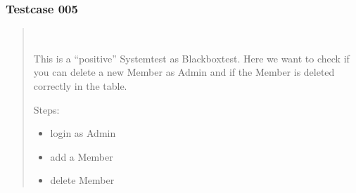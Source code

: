 \documentclass[letterpaper,10pt,english]{sphinxmanual}
\begin{document}
\subsubsection{Testcase 005}
\label{\detokenize{masterCodeDoc:testcase-005}}\begin{quote}


\begin{fulllineitems}
~

\begin{fulllineitems}
This is a “positive” Systemtest as Blackboxtest.
Here we want to check if you can delete a new Member as Admin and if the
Member is deleted correctly in the table.

Steps:
\begin{itemize}
\item {} 
login as Admin

\item {} 
add a Member

\item {} 
delete Member

\end{itemize}

\end{fulllineitems}


\end{fulllineitems}

\end{quote}
\end{document}
